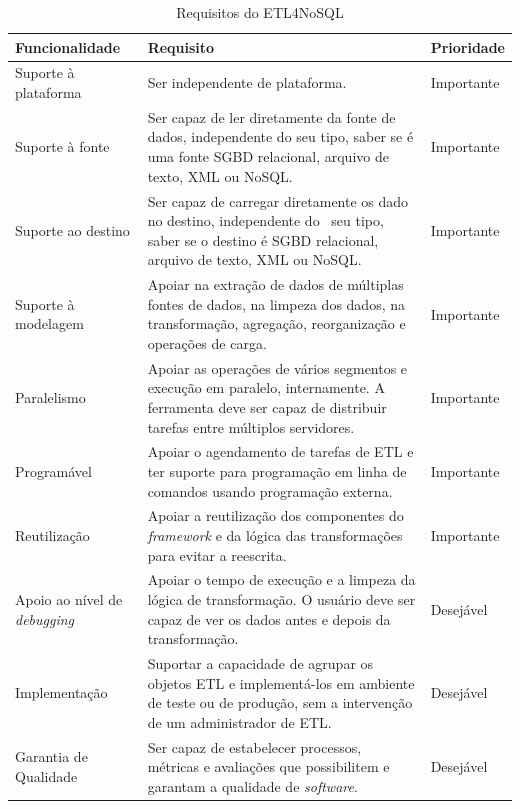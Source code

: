 \begin{table}[h]
	\centering
	\caption{Requisitos do ETL4NoSQL}
	\label{requisitos}
	\begin{tabular}{|p{3cm}| p{10cm}| p{2cm} |}
		\hline
		Funcionalidade & Requisito & Prioridade\\
		\hline
		Suporte à plataforma &  Ser independente de plataforma. & Importante\\
		\hline
		Suporte à fonte &  Ser capaz de ler diretamente da fonte de dados, independente do seu tipo, saber se é uma fonte SGBD relacional, arquivo de texto, XML ou NoSQL. & Importante\\
		\hline
		Suporte ao destino & Ser capaz de carregar diretamente os dado no destino, independente do  seu tipo, saber se o destino é SGBD relacional, arquivo de texto, XML ou NoSQL. & Importante\\
		\hline
		Suporte à modelagem & Apoiar na extração de dados de múltiplas fontes de dados, na limpeza dos dados, na transformação, agregação, reorganização e operações de carga. & Importante\\
		\hline
		Paralelismo &Apoiar as operações de vários segmentos e execução em paralelo, internamente. A ferramenta deve ser capaz de distribuir tarefas entre múltiplos servidores. & Importante\\
		\hline
		Programável &Apoiar o agendamento de tarefas de ETL e ter suporte para programação em linha de comandos usando programação externa. & Importante\\
		\hline
		Reutilização & Apoiar a reutilização dos componentes do \textit{framework} e da lógica das transformações para evitar a reescrita. & Importante\\
		\hline
		Apoio ao nível de \textit{debugging} & Apoiar o tempo de execução e a limpeza da lógica de transformação. O usuário deve ser capaz de ver os dados antes e depois da transformação. & Desejável\\
		\hline
		Implementação & Suportar a capacidade de agrupar os objetos ETL e implementá-los em ambiente de teste ou de produção, sem a intervenção de um administrador de ETL. & Desejável\\
		\hline
		Garantia de Qualidade & Ser capaz de estabelecer processos, métricas e avaliações que possibilitem e garantam a qualidade de \textit{software}. & Desejável\\
		\hline
		
		
	\end{tabular}
\end{table}


